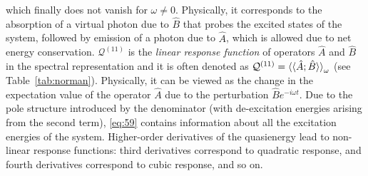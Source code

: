 \documentclass[%
class = book,%
crop = false,%
float = true,%
multi = true,%
preview = false,%
]{standalone}
\begin{document}
which finally does not vanish for \(\omega \neq 0\). Physically, it corresponds to the absorption of a virtual photon due to \(\hat{B}\) that probes the excited states of the system, followed by emission of a photon due to \(\hat{A}\), which is allowed due to net energy conservation. \(\mathcal{Q}^{(11)}\) is the \emph{linear response function} of operators \(\hat{A}\) and \(\hat{B}\) in the spectral representation and it is often denoted as \(\mathcal{Q}^{(11)} = \braket{\braket{\hat{A};\hat{B}}}_{\omega}\) (see Table~\ref{tab:norman}). Physically, it can be viewed as the change in the expectation value of the operator \(\hat{A}\) due to the perturbation \(\hat{B}e^{-i\omega t}\). Due to the pole structure introduced by the denominator (with de-excitation energies arising from the second term), \eqref{eq:59} contains information about all the excitation energies of the system. Higher-order derivatives of the quasienergy lead to non-linear response functions: third derivatives correspond to quadratic response, and fourth derivatives correspond to cubic response, and so on.

\onlyifstandalone{\printbibliography}
\end{document}
